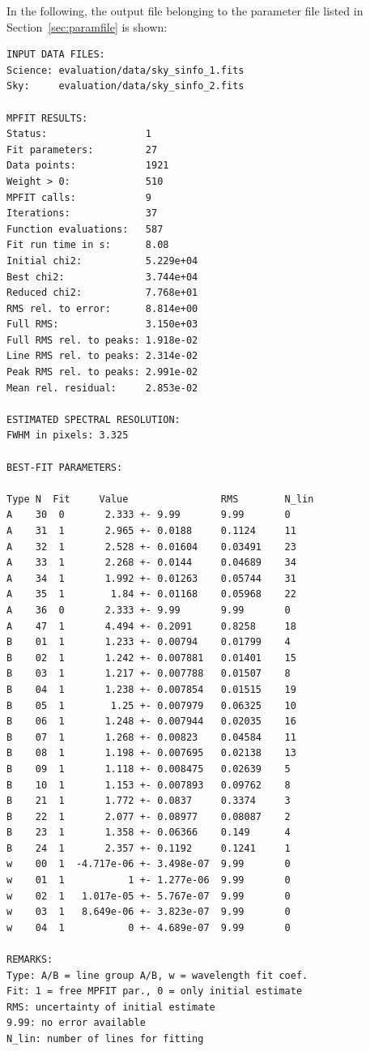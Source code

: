 In the following, the output file belonging to the parameter file listed in
Section~\ref{sec:paramfile} is shown:
\begin{verbatim}
INPUT DATA FILES:
Science: evaluation/data/sky_sinfo_1.fits
Sky:     evaluation/data/sky_sinfo_2.fits

MPFIT RESULTS:
Status:                 1
Fit parameters:         27
Data points:            1921
Weight > 0:             510
MPFIT calls:            9
Iterations:             37
Function evaluations:   587
Fit run time in s:      8.08
Initial chi2:           5.229e+04
Best chi2:              3.744e+04
Reduced chi2:           7.768e+01
RMS rel. to error:      8.814e+00
Full RMS:               3.150e+03
Full RMS rel. to peaks: 1.918e-02
Line RMS rel. to peaks: 2.314e-02
Peak RMS rel. to peaks: 2.991e-02
Mean rel. residual:     2.853e-02

ESTIMATED SPECTRAL RESOLUTION:
FWHM in pixels: 3.325

BEST-FIT PARAMETERS:

Type N  Fit     Value                RMS        N_lin
A    30  0       2.333 +- 9.99       9.99       0
A    31  1       2.965 +- 0.0188     0.1124     11
A    32  1       2.528 +- 0.01604    0.03491    23
A    33  1       2.268 +- 0.0144     0.04689    34
A    34  1       1.992 +- 0.01263    0.05744    31
A    35  1        1.84 +- 0.01168    0.05968    22
A    36  0       2.333 +- 9.99       9.99       0
A    47  1       4.494 +- 0.2091     0.8258     18
B    01  1       1.233 +- 0.00794    0.01799    4
B    02  1       1.242 +- 0.007881   0.01401    15
B    03  1       1.217 +- 0.007788   0.01507    8
B    04  1       1.238 +- 0.007854   0.01515    19
B    05  1        1.25 +- 0.007979   0.06325    10
B    06  1       1.248 +- 0.007944   0.02035    16
B    07  1       1.268 +- 0.00823    0.04584    11
B    08  1       1.198 +- 0.007695   0.02138    13
B    09  1       1.118 +- 0.008475   0.02639    5
B    10  1       1.153 +- 0.007893   0.09762    8
B    21  1       1.772 +- 0.0837     0.3374     3
B    22  1       2.077 +- 0.08977    0.08087    2
B    23  1       1.358 +- 0.06366    0.149      4
B    24  1       2.357 +- 0.1192     0.1241     1
w    00  1  -4.717e-06 +- 3.498e-07  9.99       0
w    01  1           1 +- 1.277e-06  9.99       0
w    02  1   1.017e-05 +- 5.767e-07  9.99       0
w    03  1   8.649e-06 +- 3.823e-07  9.99       0
w    04  1           0 +- 4.689e-07  9.99       0

REMARKS:
Type: A/B = line group A/B, w = wavelength fit coef.
Fit: 1 = free MPFIT par., 0 = only initial estimate
RMS: uncertainty of initial estimate
9.99: no error available
N_lin: number of lines for fitting
\end{verbatim}

